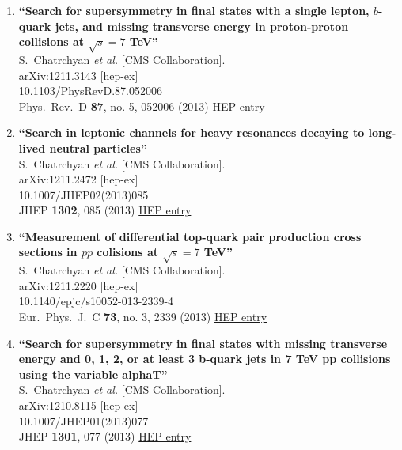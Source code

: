 \documentclass{article}
\begin{document}
\begin{enumerate}
\item%
{\bf ``Search for supersymmetry in final states with a single lepton, $b$-quark jets, and missing transverse energy in proton-proton collisions at $\sqrt{s}=7$ TeV''}
  \\{}S.~Chatrchyan {\it et al.} [CMS Collaboration].
  \\{}arXiv:1211.3143 [hep-ex]
    \\{}10.1103/PhysRevD.87.052006
\\{}Phys.\ Rev.\ D {\bf 87}, no. 5, 052006 (2013) %
\href{http://inspirehep.net/record/1202674}{HEP entry}


\item%
{\bf ``Search in leptonic channels for heavy resonances decaying to long-lived neutral particles''}
  \\{}S.~Chatrchyan {\it et al.} [CMS Collaboration].
  \\{}arXiv:1211.2472 [hep-ex]
    \\{}10.1007/JHEP02(2013)085
\\{}JHEP {\bf 1302}, 085 (2013) %
\href{http://inspirehep.net/record/1202275}{HEP entry}


\item%
{\bf ``Measurement of differential top-quark pair production cross sections in $pp$ colisions at $\sqrt{s}=7$ TeV''}
  \\{}S.~Chatrchyan {\it et al.} [CMS Collaboration].
  \\{}arXiv:1211.2220 [hep-ex]
    \\{}10.1140/epjc/s10052-013-2339-4
\\{}Eur.\ Phys.\ J.\ C {\bf 73}, no. 3, 2339 (2013) %
\href{http://inspirehep.net/record/1201946}{HEP entry}


\item%
{\bf ``Search for supersymmetry in final states with missing transverse energy and 0, 1, 2, or at least 3 b-quark jets in 7 TeV pp collisions using the variable alphaT''}
  \\{}S.~Chatrchyan {\it et al.} [CMS Collaboration].
  \\{}arXiv:1210.8115 [hep-ex]
    \\{}10.1007/JHEP01(2013)077
\\{}JHEP {\bf 1301}, 077 (2013) %
\href{http://inspirehep.net/record/1194120}{HEP entry}



\end{enumerate}
\end{document}
